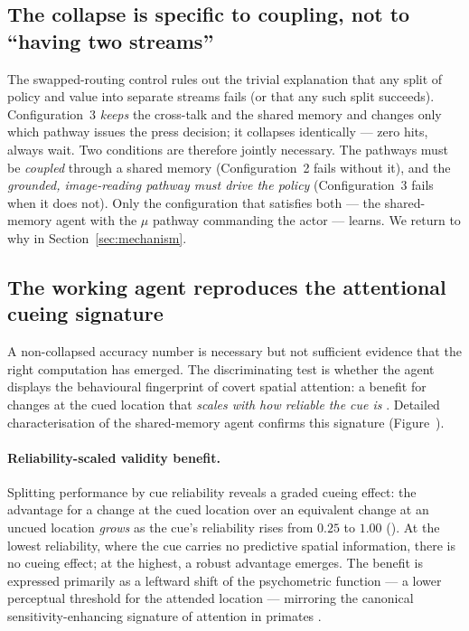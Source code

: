 \subsection{The collapse is specific to coupling, not to ``having two streams''}
\label{sec:results-swap}
The swapped-routing control rules out the trivial explanation that any split of
policy and value into separate streams fails (or that any such split succeeds).
Configuration~3 \emph{keeps} the cross-talk and the shared memory and changes only
which pathway issues the press decision; it collapses identically --- zero hits,
always wait. Two conditions are therefore jointly necessary. The pathways must be
\emph{coupled} through a shared memory (Configuration~2 fails without it), and the
\emph{grounded, image-reading pathway must drive the policy} (Configuration~3 fails
when it does not). Only the configuration that satisfies both --- the shared-memory
agent with the $\mu$ pathway commanding the actor --- learns. We return to why in
Section~\ref{sec:mechanism}.

\subsection{The working agent reproduces the attentional cueing signature}
\label{sec:results-signature}
A non-collapsed accuracy number is necessary but not sufficient evidence that the
right computation has emerged. The discriminating test is whether the agent
displays the behavioural fingerprint of covert spatial attention: a benefit for
changes at the cued location that \emph{scales with how reliable the cue is}
\citep{posner1980attention, carrasco2011visual, mayo2016graded}. Detailed
characterisation of the shared-memory agent confirms this signature
(Figure~).

\paragraph{Reliability-scaled validity benefit.}
Splitting performance by cue reliability reveals a graded cueing effect: the
advantage for a change at the cued location over an equivalent change at an uncued
location \emph{grows} as the cue's reliability rises from $0.25$ to $1.00$
(). At the lowest reliability, where
the cue carries no predictive spatial information, there is no cueing effect; at the
highest, a robust advantage emerges. The benefit is expressed primarily as a
leftward shift of the psychometric function --- a lower perceptual threshold for the
attended location --- mirroring the canonical sensitivity-enhancing signature of
attention in primates \citep{treue1999reshaping, reynolds2000attention,
cameron2002sens}.


